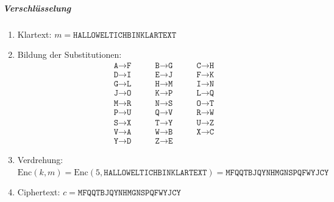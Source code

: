 \documentclass[a4paper, 11pt, accentcolor = tud3b]{tudreport}
\newcommand{\Enc}{\ensuremath{\textrm{Enc}}}
\begin{document}
	                    \subparagraph{Verschlüsselung}
		                    \begin{enumerate}
		                    	\item[] Klartext: \( m = \texttt{HALLOWELTICHBINKLARTEXT} \)
		                    	\item Bildung der Substitutionen:
			                    	\begin{equation*}
				                    	\begin{matrix*}
					                    	\texttt{A} \rightarrow \texttt{F} & \qquad \texttt{B} \rightarrow \texttt{G} & \qquad \texttt{C} \rightarrow \texttt{H} \\
					                    	\texttt{D} \rightarrow \texttt{I} & \qquad \texttt{E} \rightarrow \texttt{J} & \qquad \texttt{F} \rightarrow \texttt{K} \\
					                    	\texttt{G} \rightarrow \texttt{L} & \qquad \texttt{H} \rightarrow \texttt{M} & \qquad \texttt{I} \rightarrow \texttt{N} \\
					                    	\texttt{J} \rightarrow \texttt{O} & \qquad \texttt{K} \rightarrow \texttt{P} & \qquad \texttt{L} \rightarrow \texttt{Q} \\
					                    	\texttt{M} \rightarrow \texttt{R} & \qquad \texttt{N} \rightarrow \texttt{S} & \qquad \texttt{O} \rightarrow \texttt{T} \\
					                    	\texttt{P} \rightarrow \texttt{U} & \qquad \texttt{Q} \rightarrow \texttt{V} & \qquad \texttt{R} \rightarrow \texttt{W} \\
					                    	\texttt{S} \rightarrow \texttt{X} & \qquad \texttt{T} \rightarrow \texttt{Y} & \qquad \texttt{U} \rightarrow \texttt{Z} \\
					                    	\texttt{V} \rightarrow \texttt{A} & \qquad \texttt{W} \rightarrow \texttt{B} & \qquad \texttt{X} \rightarrow \texttt{C} \\
					                    	\texttt{Y} \rightarrow \texttt{D} & \qquad \texttt{Z} \rightarrow \texttt{E}
				                    	\end{matrix*}
				                    \end{equation*}
		                    	\item Verdrehung: \( \Enc(k, m) = \Enc(5, \texttt{HALLOWELTICHBINKLARTEXT}) = \texttt{MFQQTBJQYNHMGNSPQFWYJCY} \)
		                    	\item[] Ciphertext: \( c = \texttt{MFQQTBJQYNHMGNSPQFWYJCY} \)
		                    \end{enumerate}
	                    
\end{document}
